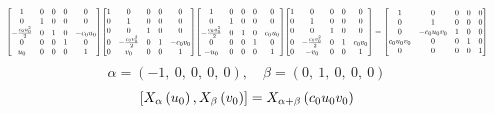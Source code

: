 \documentclass[11pt]{article}
\theoremstyle{definition}
\begin{document}
\[
\scaletoalign{\textwidth}{{\left[\begin{matrix}1 & 0 & 0 & 0 & 0\\0 & 1 & 0 & 0 & 0\\- \frac{c_{0} u_{0}^{2}}{2} & 0 & 1 & 0 & - c_{0} u_{0}\\0 & 0 & 0 & 1 & 0\\u_{0} & 0 & 0 & 0 & 1\end{matrix}\right]} {\left[\begin{matrix}1 & 0 & 0 & 0 & 0\\0 & 1 & 0 & 0 & 0\\0 & 0 & 1 & 0 & 0\\0 & - \frac{c_{0} v_{0}^{2}}{2} & 0 & 1 & - c_{0} v_{0}\\0 & v_{0} & 0 & 0 & 1\end{matrix}\right]} {\left[\begin{matrix}1 & 0 & 0 & 0 & 0\\0 & 1 & 0 & 0 & 0\\- \frac{c_{0} u_{0}^{2}}{2} & 0 & 1 & 0 & c_{0} u_{0}\\0 & 0 & 0 & 1 & 0\\- u_{0} & 0 & 0 & 0 & 1\end{matrix}\right]} {\left[\begin{matrix}1 & 0 & 0 & 0 & 0\\0 & 1 & 0 & 0 & 0\\0 & 0 & 1 & 0 & 0\\0 & - \frac{c_{0} v_{0}^{2}}{2} & 0 & 1 & c_{0} v_{0}\\0 & - v_{0} & 0 & 0 & 1\end{matrix}\right]} = {\left[\begin{matrix}1 & 0 & 0 & 0 & 0\\0 & 1 & 0 & 0 & 0\\0 & - c_{0} u_{0} v_{0} & 1 & 0 & 0\\c_{0} u_{0} v_{0} & 0 & 0 & 1 & 0\\0 & 0 & 0 & 0 & 1\end{matrix}\right]}}
\]
\[
\alpha = \left( -1, \  0, \  0, \  0, \  0\right), \quad \beta = \left( 0, \  1, \  0, \  0, \  0\right)
\]
\[
\scaletoalign{\textwidth}{\left[ X_{\alpha}\left(u_{0}\right), X_{\beta}\left(v_{0}\right) \right] = X_{\alpha + \beta}\left(c_{0} u_{0} v_{0}\right)}
\]
\end{document}
